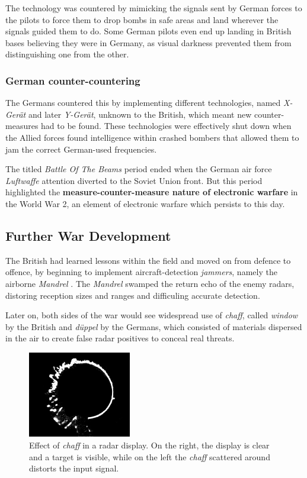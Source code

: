 \documentclass[english,purist]{ist-report}
\begin{document}
The technology was countered by mimicking the signals sent by German forces to the pilots to force them to drop bombs in safe areas and land wherever the signals guided them to do. Some German pilots even end up landing in British bases believing they were in Germany, as visual darkness prevented them from distinguishing one from the other.

\subsubsection{German counter-countering}

The Germans countered this by implementing different technologies, named \textit{X-Gerät} and later \textit{Y-Gerät}, unknown to the British, which meant new counter-measures had to be found. These technologies were effectively shut down when the Allied forces found intelligence within crashed bombers that allowed them to jam the correct German-used frequencies.

The titled \textit{Battle Of The Beams} period ended when the German air force \textit{Luftwaffe} attention diverted to the Soviet Union front. But this period highlighted the \textbf{measure-counter-measure nature of electronic warfare} in the World War 2, an element of electronic warfare which persists to this day.

\subsection{Further War Development}

The British had learned lessons within the field and moved on from defence to offence, by beginning to implement aircraft-detection \textit{jammers}, namely the airborne \textit{Mandrel} \cite{alican2006}. The \textit{Mandrel} swamped the return echo of the enemy radars, distoring reception sizes and ranges and difficuling accurate detection.

Later on, both sides of the war would see widespread use of \textit{chaff}, called \textit{window} by the British and \textit{düppel} by the Germans, which consisted of materials dispersed in the air to create false radar positives to conceal real threats.
\begin{figure}[ht]
    \centering
    \includegraphics[width = 0.4\textwidth]{chaff}
    \caption{Effect of \textit{chaff} in a radar display. On the right, the display is clear and a target is visible, while on the left the \textit{chaff} scattered around distorts the input signal.}
    \label{fig:chaff}
\end{figure}
\end{document}
